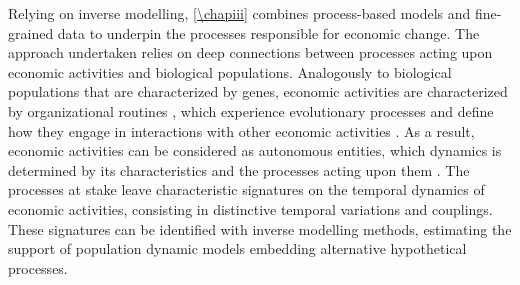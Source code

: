 % 
Relying on inverse modelling, \cref{\chapiii} combines process-based models and fine-grained data to underpin the processes responsible for economic change.
% 
The approach undertaken relies on deep connections between processes acting upon economic activities and biological populations.
% 
Analogously to biological populations that are characterized by genes, economic activities are characterized by organizational routines \citep{nelson1985evolutionary}, which experience evolutionary processes and define how they engage in interactions with other economic activities \citep{nelson1985evolutionary}.
% 
% 
As a result, economic activities can be considered as autonomous entities, which dynamics is determined by its characteristics and the processes acting upon them \citep{Boschma2005a}.
% 
The processes at stake leave characteristic signatures on the temporal dynamics of economic activities, consisting in distinctive temporal variations and couplings.
% 
These signatures can be identified with inverse modelling methods, estimating the support of population dynamic models embedding alternative hypothetical processes. %

